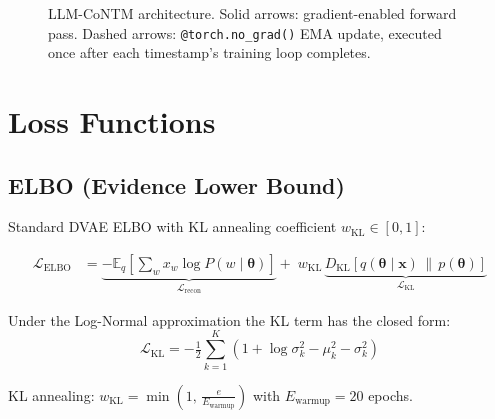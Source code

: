 \documentclass[11pt,a4paper]{article}
\begin{document}
\begin{figure}[h]
{
}
\caption{LLM-CoNTM architecture. Solid arrows: gradient-enabled forward pass.
Dashed arrows: \texttt{@torch.no\_grad()} EMA update, executed once after each
timestamp's training loop completes.}
\label{fig:arch}
\end{figure}

\section{Loss Functions}

\subsection{ELBO (Evidence Lower Bound)}

Standard DVAE ELBO with KL annealing coefficient $w_\text{KL} \in [0,1]$:

\begin{align}
  \mathcal{L}_\text{ELBO}
  &= \underbrace{-\mathbb{E}_{q}\!\left[\sum_{w} x_w \log P(w \mid \boldsymbol{\theta})\right]}_{\mathcal{L}_\text{recon}}
   + \; w_\text{KL}\,\underbrace{D_\text{KL}\!\left[q(\boldsymbol{\theta}\mid\mathbf{x}) \,\|\, p(\boldsymbol{\theta})\right]}_{\mathcal{L}_\text{KL}} \label{eq:elbo}
\end{align}

Under the Log-Normal approximation the KL term has the closed form:
\[
  \mathcal{L}_\text{KL} = -\tfrac{1}{2}\sum_{k=1}^{K}
    \left(1 + \log\sigma_k^2 - \mu_k^2 - \sigma_k^2\right)
\]

KL annealing: $w_\text{KL} = \min\!\left(1,\, \frac{e}{E_\text{warmup}}\right)$
with $E_\text{warmup}=20$ epochs.
\end{document}
